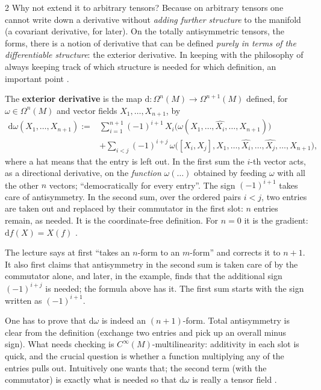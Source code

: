 \begin{paracol}{2}
Why not extend it to arbitrary tensors? Because on arbitrary tensors one cannot write down a derivative without \emph{adding further structure} to the manifold (a covariant derivative, for later). On the totally antisymmetric tensors, the forms, there is a notion of derivative that can be defined \emph{purely in terms of the differentiable structure}: the exterior derivative. In keeping with
the philosophy of always keeping track of which structure is needed for which definition, an important point    .

\begin{definition}\label{def:gr-d}
The \textbf{exterior derivative} is the map $\mathrm d\colon\Omega^n(M)\to\Omega^{n+1}(M)$ defined, for $\omega\in\Omega^n(M)$ and vector fields $X_1,\dots,X_{n+1}$, by
\[
  \begin{aligned}
  \mathrm d\omega(X_1,\dots,X_{n+1}):={}&\sum_{i=1}^{n+1}(-1)^{i+1}\,X_i\bigl(\omega(X_1,\dots,\widehat{X_i},\dots,X_{n+1})\bigr)\\
  &+\sum_{i<j}(-1)^{i+j}\,\omega\bigl([X_i,X_j],X_1,\dots,\widehat{X_i},\dots,\widehat{X_j},\dots,X_{n+1}\bigr),
  \end{aligned}
\]
where a hat means that the entry is left out. In the first sum the $i$-th vector acts, as a directional derivative, on the \emph{function} $\omega(\dots)$ obtained by feeding $\omega$ with all the other $n$ vectors; ``democratically for every entry''. The sign $(-1)^{i+1}$ takes care of antisymmetry. In the second sum, over the ordered pairs $i<j$, two entries are taken out and
replaced by their commutator in the first slot: $n$ entries remain, as needed. It is the coordinate-free definition. For $n=0$ it is the gradient: $\mathrm df(X)=X(f)$             .
\end{definition}
\begin{coursenote}
The lecture says at first ``takes an $n$-form to an $m$-form'' and corrects it to $n+1$. It also first claims that antisymmetry in the second sum is taken care of by the commutator alone, and later, in the example, finds that the additional sign $(-1)^{i+j}$ is needed; the formula above has it. The first sum starts with the sign written as $(-1)^{i+1}$.
 
\end{coursenote}
One has to prove that $\mathrm d\omega$ is indeed an $(n+1)$-form. Total antisymmetry is clear from the definition (exchange two entries and pick up an overall minus sign). What needs checking is $C^\infty(M)$-multilinearity: additivity in each slot is quick, and the crucial question is whether a function multiplying any of the entries pulls out. Intuitively one wants that; the second term (with the
commutator) is exactly what is needed so that $\mathrm d\omega$ is really a tensor field   .


\end{paracol}
